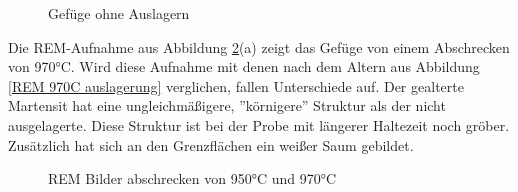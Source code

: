 \documentclass[a4paper, 11pt]{tubsreprt}
\begin{document}
\begin{figure} 		%
	\caption{Gefüge ohne Auslagern}
	\label{Gefüge ohne Alterung}
\end{figure}
\newpage
Die REM-Aufnahme aus Abbildung \ref{REM 970C und 950C}(a) zeigt das Gefüge von einem Abschrecken von 970°C. Wird diese Aufnahme mit denen nach dem Altern aus Abbildung \ref{REM 970C auslagerung} verglichen, fallen Unterschiede auf. Der gealterte Martensit hat eine ungleichmäßigere, ''körnigere''  Struktur als der nicht ausgelagerte. Diese Struktur ist bei der Probe mit längerer Haltezeit noch gröber. Zusätzlich hat sich an den Grenzflächen ein weißer Saum gebildet.
\begin{figure}
\caption{REM Bilder abschrecken von 950°C und 970°C}
\label{REM 970C und 950C}
\end{figure}
\end{document}
